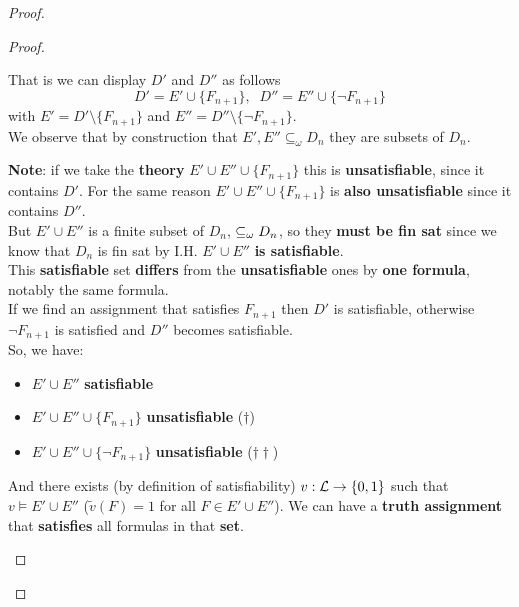 \begin{proof}
\begin{proof}
\begin{itemize}
				That is we can display $D'$ and $D''$ as follows
				$$ D' = E' \cup \{F_{n+1}\}, \;\; D'' = E'' \cup \{\neg F_{n+1}\}$$
				with $E' = D' \setminus \{F_{n+1}\}$ and $E'' = D'' \setminus \{\neg F_{n+1}\}$.\\

				We observe that by construction that $E', E'' \subseteq_\omega D_n$ they are subsets of $D_n$.\\


				\newpage

				\textbf{Note}: if we take the \textbf{theory} $E' \cup E'' \cup \{F_{n+1}\}$ this is \textbf{unsatisfiable}, since it contains $D'$. For the same reason $E' \cup E'' \cup \{F_{n+1}\}$ is \textbf{also unsatisfiable} since it contains $D''$. \\

				But $E' \cup E''$ is a finite subset of $D_n$, $\subseteq_\omega D_n$, so they \textbf{must be fin sat} since we know that $D_n$ is fin sat by I.H. $E' \cup E''$ \textbf{is satisfiable}.\\

				This \textbf{satisfiable} set \textbf{differs} from the \textbf{unsatisfiable} ones by \textbf{one formula}, notably the same formula.\\

				If we find an assignment that satisfies $F_{n+1}$ then $D'$ is satisfiable, otherwise $\neg F_{n+1}$ is satisfied and $D''$ becomes satisfiable.\\

				So, we have:
				\begin{itemize}
					\item $E' \cup E''$ \textbf{satisfiable}
					\item $E' \cup E'' \cup \{F_{n+1}\}$ \textbf{unsatisfiable} ($\dag$)
					\item $E' \cup E'' \cup \{\neg F_{n+1}\}$ \textbf{unsatisfiable} ($\dag \dag$)
				\end{itemize}

				And there exists (by definition of satisfiability) $v: \mathcal{L} \rightarrow \{0,1\}$ such that $v \models E' \cup E''$ ($\tilde{v}(F) =  1$ for all $F \in E' \cup E''$). We can have a \textbf{truth assignment} that \textbf{satisfies} all formulas in that \textbf{set}.\\


\end{itemize}
\end{proof}
\end{proof}
